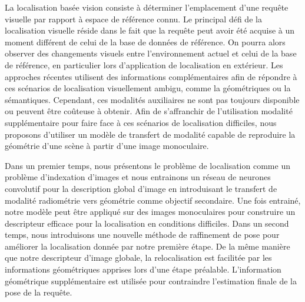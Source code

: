 \begin{abstractFrench}

La localisation basée vision consiste \`a déterminer l'emplacement d'une requête visuelle par rapport \`a espace de référence connu. Le principal d\'efi de la localisation visuelle r\'eside dans le fait que la requête peut avoir \'et\'e acquise \`a un moment diff\'erent de celui de la base de donn\'ees de r\'ef\'erence. On pourra alors observer des changements visuels entre l'environnement actuel et celui de la base de r\'ef\'erence, en particulier lors d'application de localisation en ext\'erieur. Les approches r\'ecentes utilisent des informations compl\'ementaires afin de r\'epondre \`a ces sc\'enarios de localisation visuellement ambigu, comme la g\'eom\'etriques ou la s\'emantiques. Cependant, ces modalit\'es auxiliaires ne sont pas toujours disponible ou peuvent être coûteuse \`a obtenir. Afin de s'affranchir de l'utilisation modalit\'e suppl\'ementaire pour faire face \`a ces sc\'enarios de localisation difficiles, nous proposons d'utiliser un mod\`ele de transfert de modalit\'e capable de reproduire la g\'eom\'etrie d'une sc\`ene \`a partir d'une image monoculaire. 

Dans un premier temps, nous pr\'esentons le probl\`eme de localisation comme un probl\`eme d'indexation d'images et nous entrainons un r\'eseau de neurones convolutif pour la description global d'image en introduisant le transfert de modalit\'e radiom\'etrie vers g\'eom\'etrie comme objectif secondaire. Une fois entrain\'e, notre mod\`ele peut être appliqu\'e sur des images monoculaires pour construire un descripteur efficace pour la localisation en conditions difficiles. Dans un second temps, nous introduisons une nouvelle m\'ethode de raffinement de pose pour am\'eliorer la localisation donn\'ee par notre premi\`ere \'etape. De la même mani\`ere que notre descripteur d'image globale, la relocalisation est facilit\'ee par les informations g\'eom\'etriques apprises lors d'une \'etape pr\'ealable. L'information g\'eom\'etrique suppl\'ementaire est utilis\'ee pour contraindre l'estimation finale de la pose de la requête.

\end{abstractFrench}
